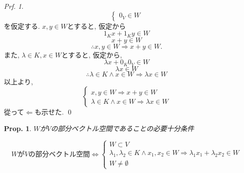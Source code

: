 \documentclass[a4paper,10pt,report]{amsart}
\theoremstyle{plain}
\newtheorem{prop}{Prop.}[section]
\theoremstyle{definition}
\theoremstyle{remark}
\newtheorem{prf}{Prf.}
\begin{document}
\begin{prf}
\begin{equation*}
\begin{cases}
            0_{V}\in W
        \end{cases}
    \end{equation*}
    を仮定する. \(x,y\in W\)とすると, 仮定から
    \begin{equation*}
        1_{K}x+1_{K}y\in W
    \end{equation*}
    \begin{equation*}
        x+y\in W
    \end{equation*}
    \begin{equation*}
        \therefore x,y\in W\Rightarrow x+y\in W.
    \end{equation*}
    また, \(\lambda\in K,x\in W\)とすると, 仮定から, 
    \begin{equation*}
        \lambda x+0_{K}0_{V}\in W
    \end{equation*}
    \begin{equation*}
        \lambda x\in W
    \end{equation*}
    \begin{equation*}
        \therefore \lambda\in K\wedge x\in W\Rightarrow \lambda x\in W
    \end{equation*}
    以上より,
    \begin{equation*}
        \begin{cases}
            x, y\in W\Rightarrow x+y\in W\\
            \lambda\in K\wedge x\in W\Rightarrow \lambda x\in W
        \end{cases}
    \end{equation*}
    從って\(\Leftarrow{}\)も示せた. 
    \qed{}
\end{prf}
\begin{leftbar}
    \begin{prop}\label{prop::NSC_for_linear_subspace_3}\(W\)が\(V\)の部分ベクトル空間であることの必要十分条件\par
        \begin{equation*}
            \mbox{\(W\)が\(V\)の部分ベクトル空間}\Leftrightarrow
            \begin{cases}
                W\subset V\\
                \lambda_{1}, \lambda_{2}\in K\wedge x_{1}, x_{2}\in W\Rightarrow \lambda_{1}x_{1}+\lambda_{2}x_{2}\in W\\
                W\neq \emptyset
            \end{cases}
        \end{equation*}
    \end{prop}
\end{leftbar}
\end{document}
